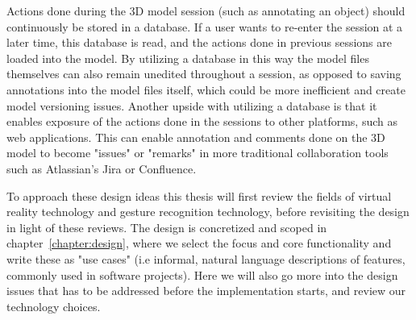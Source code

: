 Actions done during the 3D model session (such as annotating an object) should continuously be stored in a database. 
If a user wants to re-enter the session at a later time, this database is read, and the actions done in previous sessions are loaded into the model.
By utilizing a database 
in this way the model files themselves can also remain unedited throughout a session, as opposed to saving annotations into the model files itself, 
which could be more inefficient and create model versioning issues. 
Another upside with utilizing a database is that it enables exposure of the actions done in the sessions to other platforms, such as web applications. 
This can enable annotation and comments done on the 3D model to become "issues" or "remarks" in more traditional collaboration tools such as Atlassian's Jira or Confluence.

To approach these design ideas this thesis will first review the fields of virtual reality technology and gesture recognition technology, before revisiting the design in light
of these reviews. The design is concretized and scoped in chapter~\vref{chapter:design}, where we select the focus and core functionality and write these as 
"use cases" (i.e informal, natural language descriptions of features, commonly used in software projects). Here we will also go more into the design issues that has to be
addressed before the implementation starts, and review our technology choices.  






